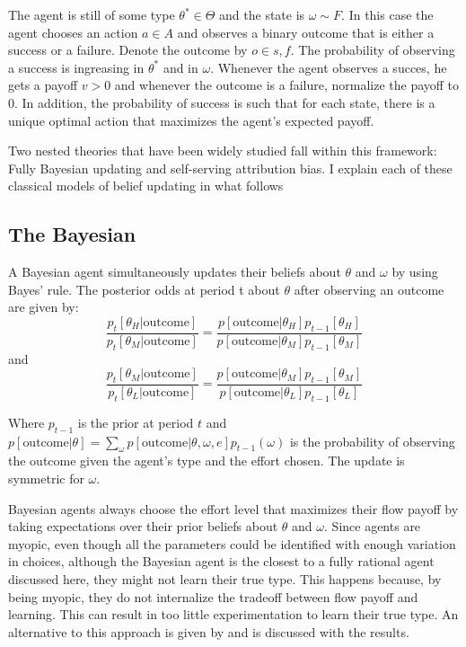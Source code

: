 \documentclass[
  12pt,
]{article}
\begin{document}
The agent is still of some type \(\theta^* \in \Theta\) and the state is
\(\omega \sim F\). In this case the agent chooses an action \(a\in A\)
and observes a binary outcome that is either a success or a failure.
Denote the outcome by \(o \in {s,f}\). The probability of observing a
success is ingreasing in \(\theta^*\) and in \(\omega\). Whenever the
agent observes a succes, he gets a payoff \(v>0\) and whenever the
outcome is a failure, normalize the payoff to 0. In addition, the
probability of success is such that for each state, there is a unique
optimal action that maximizes the agent's expected payoff.

Two nested theories that have been widely studied fall within this
framework: Fully Bayesian updating and self-serving attribution bias. I
explain each of these classical models of belief updating in what
follows

\hypertarget{the-bayesian}{%
\subsection{The Bayesian}\label{the-bayesian}}

A Bayesian agent simultaneously updates their beliefs about \(\theta\)
and \(\omega\) by using Bayes' rule. The posterior odds at period t
about \(\theta\) after observing an outcome are given by: \[
\frac{p_{t}[\theta_H|\text{outcome}]}{p_{t}[\theta_M|\text{outcome}]} = 
      \frac{p[\text{outcome}|\theta_H]p_{t-1}[\theta_H]}{p[\text{outcome}|\theta_M]p_{t-1}[\theta_M]}
\] and \[
\frac{p_{t}[\theta_M|\text{outcome}]}{p_{t}[\theta_L|\text{outcome}]} = 
      \frac{p[\text{outcome}|\theta_M]p_{t-1}[\theta_M]}{p[\text{outcome}|\theta_L]p_{t-1}[\theta_L]}
\]

Where \(p_{t-1}\) is the prior at period \(t\) and
\(p[\text{outcome}|\theta] = \sum_{\omega} p[\text{outcome}|\theta, \omega, e]p_{t-1}(\omega)\)
is the probability of observing the outcome given the agent's type and
the effort chosen. The update is symmetric for \(\omega\).

Bayesian agents always choose the effort level that maximizes their flow
payoff by taking expectations over their prior beliefs about \(\theta\)
and \(\omega\). Since agents are myopic, even though all the parameters
could be identified with enough variation in choices, although the
Bayesian agent is the closest to a fully rational agent discussed here,
they might not learn their true type. This happens because, by being
myopic, they do not internalize the tradeoff between flow payoff and
learning. This can result in too little experimentation to learn their
true type. An alternative to this approach is given by
\citet{Hestermann2021} and is discussed with the results.
\end{document}
